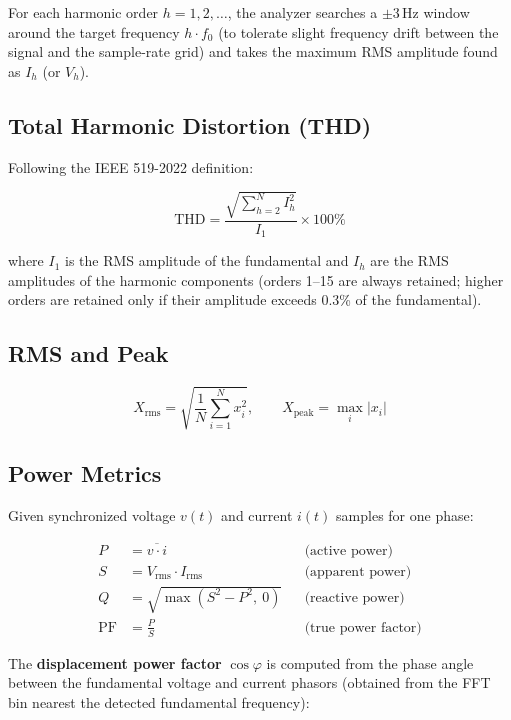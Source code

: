 \documentclass[11pt,a4paper]{article}
\begin{document}
For each harmonic order $h = 1, 2, \ldots$, the analyzer searches a $\pm
3$\,Hz window around the target frequency $h \cdot f_0$ (to tolerate slight
frequency drift between the signal and the sample-rate grid) and takes the
maximum RMS amplitude found as $I_h$ (or $V_h$).

\subsection{Total Harmonic Distortion (THD)}

Following the IEEE 519-2022 definition:

\begin{equation}
\mathrm{THD} = \frac{\sqrt{\displaystyle\sum_{h=2}^{N} I_h^2}}{I_1} \times 100\%
\end{equation}

where $I_1$ is the RMS amplitude of the fundamental and $I_h$ are the RMS
amplitudes of the harmonic components (orders 1--15 are always retained;
higher orders are retained only if their amplitude exceeds 0.3\% of the
fundamental).

\subsection{RMS and Peak}

\begin{equation}
X_{\mathrm{rms}} = \sqrt{\frac{1}{N}\sum_{i=1}^{N} x_i^2}, \qquad
X_{\mathrm{peak}} = \max_i |x_i|
\end{equation}

\subsection{Power Metrics}

Given synchronized voltage $v(t)$ and current $i(t)$ samples for one phase:

\begin{align}
P &= \overline{v \cdot i} && \text{(active power)} \\
S &= V_{\mathrm{rms}} \cdot I_{\mathrm{rms}} && \text{(apparent power)} \\
Q &= \sqrt{\max(S^2 - P^2,\ 0)} && \text{(reactive power)} \\
\mathrm{PF} &= \frac{P}{S} && \text{(true power factor)}
\end{align}

The \textbf{displacement power factor} $\cos\varphi$ is computed from the
phase angle between the fundamental voltage and current phasors (obtained
from the FFT bin nearest the detected fundamental frequency):
\end{document}
